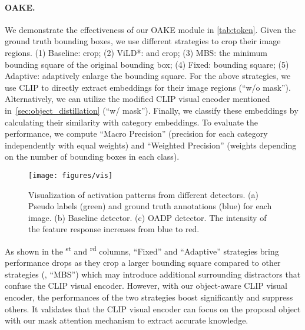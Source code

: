 \documentclass[10pt,twocolumn,letterpaper]{article}
\begin{document}
\paragraph{OAKE.} We demonstrate the effectiveness of our OAKE module in \cref{tab:token}.
Given the ground truth bounding boxes, we use different strategies to crop their image regions.
(1) Baseline:  crop;
(2) ViLD*:  and  crop;
(3) MBS: the minimum bounding square of the original bounding box;
(4) Fixed:  bounding square;
(5) Adaptive: adaptively enlarge the bounding square.
For the above strategies, we use CLIP to directly extract embeddings for their image regions (``w/o mask'').
Alternatively, we can utilize the modified CLIP visual encoder mentioned in~\cref{sec:object_distillation} (``w/ mask'').
Finally, we classify these embeddings by calculating their similarity with category embeddings.
To evaluate the performance, we compute ``Macro Precision'' (precision for each category independently with equal weights) and ``Weighted Precision'' (weights depending on the number of bounding boxes in each class).

\begin{figure*}[t]
  \centering
  \texttt{[image: figures/vis]}
  \caption{
    Visualization of activation patterns from different detectors.
    (a) Pseudo labels (green) and ground truth annotations (blue) for each image.
    (b) Baseline detector.
    (c) OADP detector.
    The intensity of the feature response increases from blue to red.
  }
  \label{fig:vis}
\end{figure*}

As shown in the \textsuperscript{st} and \textsuperscript{rd} columns, ``Fixed'' and ``Adaptive'' strategies bring performance drops as they crop a larger bounding square compared to other strategies (\eg, ``MBS'') which may introduce additional surrounding distractors that confuse the CLIP visual encoder.
However, with our object-aware CLIP visual encoder, the performances of the two strategies boost significantly and suppress others.
It validates that the CLIP visual encoder can focus on the proposal object with our mask attention mechanism to extract accurate knowledge.
\end{document}
